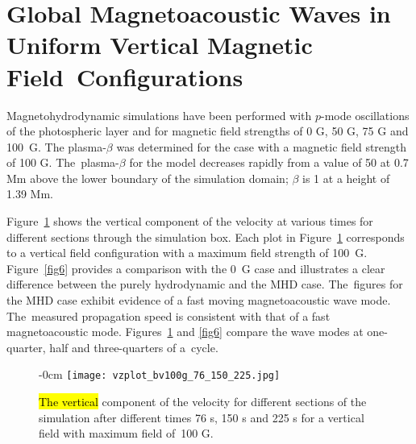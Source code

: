\documentclass[physics,article,accept,pdftex,moreauthors]{Definitions/mdpi}
\begin{document}
\section{Global Magnetoacoustic Waves in Uniform Vertical Magnetic Field~Configurations}

Magnetohydrodynamic simulations have been performed with $p$-mode oscillations of the photospheric layer and for magnetic field strengths of 0 G, 50 G, 75 G and 100~G. The plasma-$\beta$ was determined for the case with a magnetic field strength of 100 G. The~plasma-$\beta$ for the model decreases rapidly from a value of 50 at 0.7 Mm above the lower boundary of the simulation domain; $\beta$ is 1 at a height of 1.39 Mm.  



 Figure~\ref{fig5} %
 shows the vertical component of the velocity at various times for different sections through the simulation box. Each plot in  Figure~\ref{fig5} %
 corresponds to a vertical field configuration with a maximum field strength of 100~G. Figure~\ref{fig6} provides a comparison with the 0~G case and %
 illustrates a clear difference between the purely hydrodynamic and the MHD case. The~figures for the MHD case exhibit evidence of a fast moving magnetoacoustic wave mode. The~measured propagation speed is consistent with that of a fast magnetoacoustic mode. Figures~\ref{fig5} and \ref{fig6} compare the wave modes at one-quarter, half and three-quarters of a~cycle. 
 
 \begin{figure}[H]

\begin{adjustwidth}{-\extralength}{0cm}
\centering %
\texttt{[image: vzplot\_bv100g\_76\_150\_225.jpg]}
\end{adjustwidth}
\caption{\hl{The vertical} %
component of the velocity for different sections of the simulation after different times 76 s, 150 s and 225 s for a vertical field with maximum field of~100 G.\label{fig5}}
\end{figure}
\end{document}
